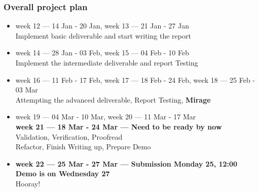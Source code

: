\documentclass{beamer}
\begin{document}
\begin{frame}
	\frametitle{Overall project plan}

	\begin{itemize}
		\item week 12 --- 14 Jan - 20 Jan,
		      week 13 --- 21 Jan - 27 Jan \\
		      Implement basic deliverable
		      and start writing
		      the report
		\item week 14 --- 28 Jan - 03 Feb,
		      week 15 --- 04 Feb - 10 Feb \\ Implement the intermediate
		      deliverable and report Testing
		\item week 16 --- 11 Feb - 17 Feb,
		      week 17 --- 18 Feb - 24 Feb,
		      week 18 --- 25 Feb - 03 Mar \\ Attempting the advanced
		      deliverable, Report Testing, \textbf{Mirage}
		\item week 19 --- 04 Mar - 10 Mar,
		      week 20 --- 11 Mar - 17 Mar \\
		      \textbf{week 21 --- 18 Mar - 24 Mar ---
			      Need to be ready by now} \\
		      Validation,
		      Verification,
		      Proofread \\
		      Refactor,
		      Finish Writing up,
		      Prepare Demo
		\item \textbf{week 22 --- 25 Mar - 27 Mar ---
			      Submission Monday 25, 12:00
			      Demo is on Wednesday 27} \\ Hooray!
	\end{itemize}
\end{frame}
\end{document}
